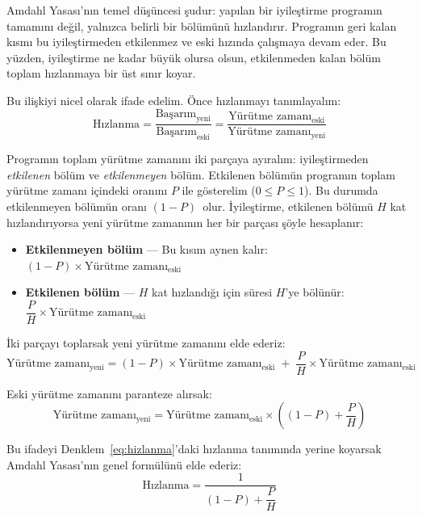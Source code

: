 Amdahl Yasası'nın temel düşüncesi şudur: yapılan bir iyileştirme programın tamamını değil, yalnızca belirli bir bölümünü hızlandırır. Programın geri kalan kısmı bu iyileştirmeden etkilenmez ve eski hızında çalışmaya devam eder. Bu yüzden, iyileştirme ne kadar büyük olursa olsun, etkilenmeden kalan bölüm toplam hızlanmaya bir üst sınır koyar.

Bu ilişkiyi nicel olarak ifade edelim. Önce hızlanmayı tanımlayalım:
\begin{equation}
\text{Hızlanma} = \frac{\text{Başarım}_{\text{yeni}}}{\text{Başarım}_{\text{eski}}} = \frac{\text{Yürütme zamanı}_{\text{eski}}}{\text{Yürütme zamanı}_{\text{yeni}}}
\label{eq:hizlanma}
\end{equation}

Programın toplam yürütme zamanını iki parçaya ayıralım: iyileştirmeden \emph{etkilenen} bölüm ve \emph{etkilenmeyen} bölüm. Etkilenen bölümün programın toplam yürütme zamanı içindeki oranını $P$ ile gösterelim ($0 \le P \le 1$). Bu durumda etkilenmeyen bölümün oranı $(1-P)$~olur. İyileştirme, etkilenen bölümü $H$ kat hızlandırıyorsa yeni yürütme zamanının her bir parçası şöyle hesaplanır:
\begin{itemize}
    \item \textbf{Etkilenmeyen bölüm} --- Bu kısım aynen kalır: \quad $(1-P) \times \text{Yürütme zamanı}_{\text{eski}}$
    \item \textbf{Etkilenen bölüm} --- $H$ kat hızlandığı için süresi $H$'ye bölünür: \quad $\dfrac{P}{H} \times \text{Yürütme zamanı}_{\text{eski}}$
\end{itemize}

İki parçayı toplarsak yeni yürütme zamanını elde ederiz:
\begin{equation}
\text{Yürütme zamanı}_{\text{yeni}} = (1 - P) \times \text{Yürütme zamanı}_{\text{eski}} \;+\; \frac{P}{H} \times \text{Yürütme zamanı}_{\text{eski}}
\end{equation}

Eski yürütme zamanını paranteze alırsak:
\begin{equation}
\text{Yürütme zamanı}_{\text{yeni}} = \text{Yürütme zamanı}_{\text{eski}} \times \left( (1 - P) + \frac{P}{H} \right)
\label{eq:amdahl-zaman}
\end{equation}

Bu ifadeyi Denklem~\ref{eq:hizlanma}'daki hızlanma tanımında yerine koyarsak Amdahl Yasası'nın genel formülünü elde ederiz:
\begin{equation}
\text{Hızlanma} = \frac{1}{(1-P) + \dfrac{P}{H}}
\label{eq:amdahl}
\end{equation}

